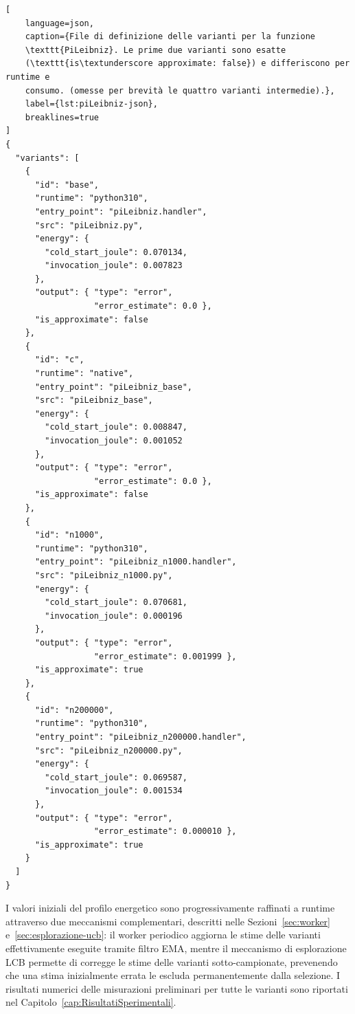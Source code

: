 \begin{lstlisting}[
    language=json,
    caption={File di definizione delle varianti per la funzione
    \texttt{PiLeibniz}. Le prime due varianti sono esatte
    (\texttt{is\textunderscore approximate: false}) e differiscono per runtime e
    consumo. (omesse per brevità le quattro varianti intermedie).},
    label={lst:piLeibniz-json},
    breaklines=true
]
{
  "variants": [
    {
      "id": "base",
      "runtime": "python310",
      "entry_point": "piLeibniz.handler",
      "src": "piLeibniz.py",
      "energy": {
        "cold_start_joule": 0.070134,
        "invocation_joule": 0.007823
      },
      "output": { "type": "error",
                  "error_estimate": 0.0 },
      "is_approximate": false
    },
    {
      "id": "c",
      "runtime": "native",
      "entry_point": "piLeibniz_base",
      "src": "piLeibniz_base",
      "energy": {
        "cold_start_joule": 0.008847,
        "invocation_joule": 0.001052
      },
      "output": { "type": "error",
                  "error_estimate": 0.0 },
      "is_approximate": false
    },
    {
      "id": "n1000",
      "runtime": "python310",
      "entry_point": "piLeibniz_n1000.handler",
      "src": "piLeibniz_n1000.py",
      "energy": {
        "cold_start_joule": 0.070681,
        "invocation_joule": 0.000196
      },
      "output": { "type": "error",
                  "error_estimate": 0.001999 },
      "is_approximate": true
    },
    {
      "id": "n200000",
      "runtime": "python310",
      "entry_point": "piLeibniz_n200000.handler",
      "src": "piLeibniz_n200000.py",
      "energy": {
        "cold_start_joule": 0.069587,
        "invocation_joule": 0.001534
      },
      "output": { "type": "error",
                  "error_estimate": 0.000010 },
      "is_approximate": true
    }
  ]
}
\end{lstlisting}
 
I valori iniziali del profilo energetico sono progressivamente raffinati
a runtime attraverso due meccanismi complementari, descritti nelle
Sezioni~\ref{sec:worker} e~\ref{sec:esplorazione-ucb}: il worker periodico
aggiorna le stime delle varianti effettivamente eseguite tramite filtro EMA,
mentre il meccanismo di esplorazione LCB permette di corregge le stime delle varianti
sotto-campionate, prevenendo che una stima inizialmente errata le escluda
permanentemente dalla selezione. I risultati numerici delle misurazioni
preliminari per tutte le varianti sono riportati nel
Capitolo~\ref{cap:RisultatiSperimentali}. %
 
